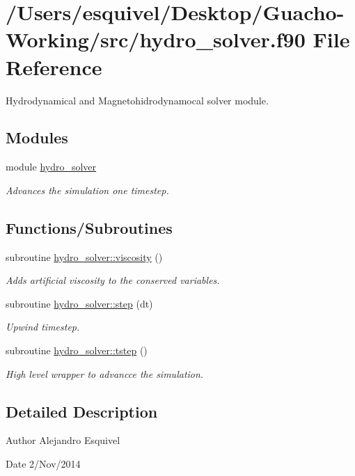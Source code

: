 \hypertarget{hydro__solver_8f90}{}\section{/\+Users/esquivel/\+Desktop/\+Guacho-\/\+Working/src/hydro\+\_\+solver.f90 File Reference}
\label{hydro__solver_8f90}


Hydrodynamical and Magnetohidrodynamocal solver module.  


\subsection*{Modules}
\begin{DoxyCompactItemize}
\item 
module \hyperlink{namespacehydro__solver}{hydro\+\_\+solver}
\begin{DoxyCompactList}\small\item\em Advances the simulation one timestep. \end{DoxyCompactList}\end{DoxyCompactItemize}
\subsection*{Functions/\+Subroutines}
\begin{DoxyCompactItemize}
\item 
subroutine \hyperlink{namespacehydro__solver_a88127baf969063d6d9a31845fa7c1835}{hydro\+\_\+solver\+::viscosity} ()
\begin{DoxyCompactList}\small\item\em Adds artificial viscosity to the conserved variables. \end{DoxyCompactList}\item 
subroutine \hyperlink{namespacehydro__solver_ac34a166e9ddd81f20f2b271138458a1a}{hydro\+\_\+solver\+::step} (dt)
\begin{DoxyCompactList}\small\item\em Upwind timestep. \end{DoxyCompactList}\item 
subroutine \hyperlink{namespacehydro__solver_aa95013d45fe4922819805e68527ab3b5}{hydro\+\_\+solver\+::tstep} ()
\begin{DoxyCompactList}\small\item\em High level wrapper to advancce the simulation. \end{DoxyCompactList}\end{DoxyCompactItemize}


\subsection{Detailed Description}
\begin{DoxyAuthor}{Author}
Alejandro Esquivel 
\end{DoxyAuthor}
\begin{DoxyDate}{Date}
2/\+Nov/2014 
\end{DoxyDate}
